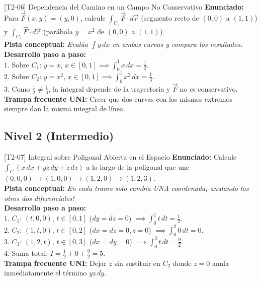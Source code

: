 \documentclass[11pt,a4paper]{article}
\begin{document}
\begin{ejerciciobox}{[T2-06] Dependencia del Camino en un Campo No Conservativo}
\textbf{Enunciado:} Para $\vec{F}(x,y) = (y, 0)$, calcule $\int_{C_1} \vec{F}\cdot d\vec{r}$ (segmento recto de $(0,0)$ a $(1,1)$) y $\int_{C_2} \vec{F}\cdot d\vec{r}$ (parábola $y = x^2$ de $(0,0)$ a $(1,1)$).\\[0.2cm]
\textbf{Pista conceptual:} \emph{Evalúa $\int y\,dx$ en ambas curvas y compara los resultados.}\\[0.2cm]
\textbf{Desarrollo paso a paso:}\\
1. Sobre $C_1$: $y = x$, $x \in [0,1] \implies \int_0^1 x\,dx = \frac{1}{2}$.\\
2. Sobre $C_2$: $y = x^2$, $x \in [0,1] \implies \int_0^1 x^2\,dx = \frac{1}{3}$.\\
3. Como $\frac{1}{2} \neq \frac{1}{3}$, la integral depende de la trayectoria y $\vec{F}$ no es conservativo.\\[0.2cm]
\textbf{Trampa frecuente UNI:} Creer que dos curvas con los mismos extremos siempre dan la misma integral de línea.
\end{ejerciciobox}

\subsection{Nivel 2 (Intermedio)}

\begin{ejerciciobox}{[T2-07] Integral sobre Poligonal Abierta en el Espacio}
\textbf{Enunciado:} Calcule $\int_C (x\,dx + yz\,dy + z\,dz)$ a lo largo de la poligonal que une $(0,0,0) \to (1,0,0) \to (1,2,0) \to (1,2,3)$.\\[0.2cm]
\textbf{Pista conceptual:} \emph{En cada tramo solo cambia UNA coordenada, anulando los otros dos diferenciales!}\\[0.2cm]
\textbf{Desarrollo paso a paso:}\\
1. $C_1$: $(t,0,0)$, $t\in[0,1]$ ($dy=dz=0$) $\implies \int_0^1 t\,dt = \frac{1}{2}$.\\
2. $C_2$: $(1,t,0)$, $t\in[0,2]$ ($dx=dz=0, z=0$) $\implies \int_0^2 0\,dt = 0$.\\
3. $C_3$: $(1,2,t)$, $t\in[0,3]$ ($dx=dy=0$) $\implies \int_0^3 t\,dt = \frac{9}{2}$.\\
4. Suma total: $I = \frac{1}{2} + 0 + \frac{9}{2} = 5$.\\[0.2cm]
\textbf{Trampa frecuente UNI:} Dejar $z$ sin sustituir en $C_2$ donde $z = 0$ anula inmediatamente el término $yz\,dy$.
\end{ejerciciobox}
\end{document}
